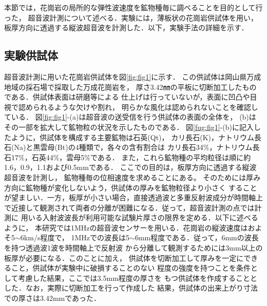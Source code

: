 ﻿%
本節では，花崗岩の局所的な弾性波速度を鉱物種毎に調べることを目的として行った，
超音波計測について述べる．実験には，薄板状の花崗岩供試体を用い，
板厚方向に透過する縦波超音波を計測した．以下，実験手法の詳細を示す．
\subsection{実験供試体}
超音波計測に用いた花崗岩供試体を図\ref{fig:fig1}に示す．
この供試体は岡山県万成地域の採石場で採取した万成花崗岩を，
厚さ3.42㎜の平板に切断加工したものである．供試体表面は研磨等による
仕上げは行っていないが，表面に凹凸や目視で認められるような欠けや割れ，
明らかな風化は認められないことを確認している．
図\ref{fig:fig1}-(a)は超音波の送受信を行う供試体の表面の全体を，
(b)はその一部を拡大して鉱物粒の状況を示したものである．
図\ref{fug:fig1}-(b)に記入したように，供試体を構成する主要鉱物は石英(Qt)，
カリ長石(K)，ナトリウム長石(Na)と黒雲母(Bt)の4種類で，各々の含有割合は
カリ長石34\%，ナトリウム長石17\%，石英44\%，雲母5\%である．
また，これら鉱物種の平均粒径は順に約1.6，0.9，1.1および0.5mmである．
ここでの目的は，板厚方向に透過する縦波超音波を計測し，
鉱物種毎の位相速度を求めることにある。
そのためには厚み方向に鉱物種が変化しないよう，供試体の厚みを鉱物粒径より小さく
することが望ましい．一方，板厚が小さい場合，直接透過波と多重反射波成分が時間軸上
で近接して観測されて両者の分離が困難になる．従って，超音波計測の点では計測に
用いる入射波波長が利用可能な試験片厚さの限界を定める．以下に述べるように，
本研究では1MHzの超音波センサーを用いる．花崗岩の縦波速度はおよそ5$\sim$6km/s程度で，
1MHzでの波長は5$\sim$6mm程度である．従って，6mmの波長を持つ透過波1波を時間軸上で反射波
から分離して観測するためには3mm以上の板厚が必要になる．このことに加え，
供試体を切断加工して厚みを一定にできること，供試体が実験中に破損することのない
程度の強度を持つことを条件として考慮した結果，ここでは3.5mm程度の厚さを
もつ供試体を作成することとした．なお，実際に切断加工を行って作成した
結果，供試体の出来上がり寸法での厚さは3.42mmであった．

